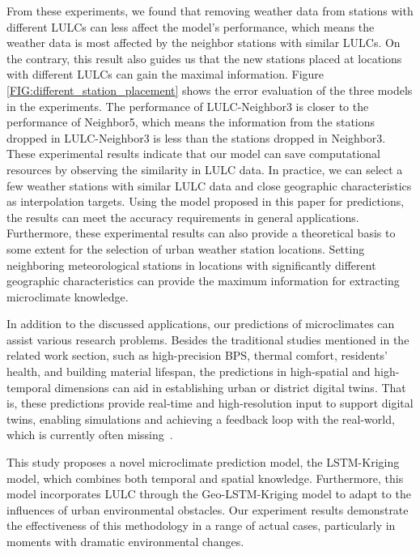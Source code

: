 \documentclass[a4paper,fleqn]{cas-sc}
\begin{document}
From these experiments, we found that removing weather data from stations with different LULCs can less affect the model's performance, which means the weather data is most affected by the neighbor stations with similar LULCs. On the contrary, this result also guides us that the new stations placed at locations with different LULCs can gain the maximal information. Figure \ref{FIG:different_station_placement} shows the error evaluation of the three models in the experiments. The performance of LULC-Neighbor3 is closer to the performance of Neighbor5, which means the information from the stations dropped in LULC-Neighbor3 is less than the stations dropped in Neighbor3. These experimental results indicate that our model can save computational resources by observing the similarity in LULC data. In practice, we can select a few weather stations with similar LULC data and close geographic characteristics as interpolation targets. Using the model proposed in this paper for predictions, the results can meet the accuracy requirements in general applications. Furthermore, these experimental results can also provide a theoretical basis to some extent for the selection of urban weather station locations. Setting neighboring meteorological stations in locations with significantly different geographic characteristics can provide the maximum information for extracting microclimate knowledge. 
\fi

In addition to the discussed applications, our predictions of microclimates can assist various research problems. Besides the traditional studies mentioned in the related work section, such as high-precision BPS, thermal comfort, residents' health, and building material lifespan, the predictions in high-spatial and high-temporal dimensions can aid in establishing urban or district digital twins. That is, these predictions provide real-time and high-resolution input to support digital twins, enabling simulations and achieving a feedback loop with the real-world, which is currently often missing~\citep{2023_autcon_dt_challenges,2023_scs_human_dt}. 


This study proposes a novel microclimate prediction model, the LSTM-Kriging model, which combines both temporal and spatial knowledge. Furthermore, this model incorporates LULC through the Geo-LSTM-Kriging model to adapt to the influences of urban environmental obstacles. Our experiment results demonstrate the effectiveness of this methodology in a range of actual cases, particularly in moments with dramatic environmental changes.
\end{document}
